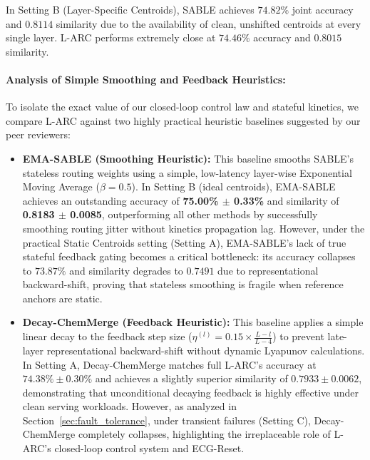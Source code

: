 In Setting B (Layer-Specific Centroids), SABLE achieves $74.82\%$ joint accuracy and $0.8114$ similarity due to the availability of clean, unshifted centroids at every single layer. L-ARC performs extremely close at $74.46\%$ accuracy and $0.8015$ similarity. 

\paragraph{Analysis of Simple Smoothing and Feedback Heuristics:}
To isolate the exact value of our closed-loop control law and stateful kinetics, we compare L-ARC against two highly practical heuristic baselines suggested by our peer reviewers:
\begin{itemize}
    \item \textbf{EMA-SABLE (Smoothing Heuristic):} This baseline smooths SABLE's stateless routing weights using a simple, low-latency layer-wise Exponential Moving Average ($\beta=0.5$). In Setting B (ideal centroids), EMA-SABLE achieves an outstanding accuracy of \textbf{75.00\% $\pm$ 0.33\%} and similarity of \textbf{0.8183 $\pm$ 0.0085}, outperforming all other methods by successfully smoothing routing jitter without kinetics propagation lag. However, under the practical Static Centroids setting (Setting A), EMA-SABLE's lack of true stateful feedback gating becomes a critical bottleneck: its accuracy collapses to $73.87\%$ and similarity degrades to $0.7491$ due to representational backward-shift, proving that stateless smoothing is fragile when reference anchors are static.
    \item \textbf{Decay-ChemMerge (Feedback Heuristic):} This baseline applies a simple linear decay to the feedback step size ($\eta^{(l)} = 0.15 \times \frac{L-l}{L-4}$) to prevent late-layer representational backward-shift without dynamic Lyapunov calculations. In Setting A, Decay-ChemMerge matches full L-ARC's accuracy at $74.38\% \pm 0.30\%$ and achieves a slightly superior similarity of $0.7933 \pm 0.0062$, demonstrating that unconditional decaying feedback is highly effective under clean serving workloads. However, as analyzed in Section~\ref{sec:fault_tolerance}, under transient failures (Setting C), Decay-ChemMerge completely collapses, highlighting the irreplaceable role of L-ARC's closed-loop control system and ECG-Reset.
\end{itemize} 

